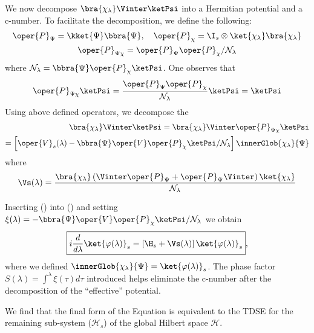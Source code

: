 We now decompose $\bra{\chi_\lambda}\Vinter\ketPsi$ into a Hermitian potential and a c-number. To facilitate the decomposition, we define the following:
 \begin{equation}
     \begin{gathered}
         \oper{P}_\Psi =\kket{\Psi} \bbra{\Psi}, \quad \oper{P}_\chi = \I_s \otimes \ket{\chi_\lambda}\bra{\chi_\lambda}\\
         \oper{P}_{\Psi \chi} = \oper{P}_\Psi\oper{P}_\chi /\mathcal{N}_\lambda
     \end{gathered}
 \end{equation}
where \(\mathcal{N}_\lambda = \bbra{\Psi}\oper{P}_\chi\ketPsi\). One observes that
\begin{equation}
\oper{P}_{\Psi \chi}\ketPsi = \frac{\oper{P}_\Psi\oper{P}_\chi}{\mathcal{N}_\lambda} \ketPsi
    = \ketPsi
\end{equation}
 Using above defined operators, we decompose the 
 \begin{equation}
 \label{eq:effective_Vs}
     \begin{aligned}
         \bra{\chi_\lambda}\Vinter\ketPsi = \bra{\chi_\lambda}\Vinter\oper{P}_{\Psi \chi}\ketPsi\\
         = \left[\oper{V}_s (\lambda)- \bbra{\Psi} \oper{V}\oper{P}_\chi \ketPsi/\mathcal{N}_\lambda \right] \innerGlob{\chi_\lambda}{\Psi}
     \end{aligned}
 \end{equation}
where 
\begin{equation}
    \label{eq:chap3_effective_Vs}
    \Vs(\lambda) = \frac{\bra{\chi_\lambda} \left(\Vinter\oper{P}_{\Psi} + \oper{P}_{\Psi}\Vinter\right)\ket{\chi_\lambda}}{\mathcal{N}_\lambda}
\end{equation}

Inserting () into () and setting \(\xi(\lambda) = -\bbra{\Psi} \oper{V}\oper{P}_\chi \ketPsi/\mathcal{N}_\lambda\) we obtain
\begin{equation}
\label{eq:chap3_sebgem_TDSE}
 \boxed{ i\dfrac{d}{d\lambda}\ket{\varphi(\lambda)}_s= \left[\H_s + \Vs (\lambda)\right]\ket{\varphi(\lambda)}_s},
\end{equation}
where we defined \(\innerGlob{\chi_\lambda}{\Psi} = \ket{\varphi(\lambda)}_s\).  The phase factor  \(S(\lambda) = \int^\lambda \xi(\tau)d\tau \) introduced helps eliminate the c-number after the decomposition of the ``effective'' potential. 

We find that the final form of the Equation is equivalent to the TDSE for the remaining sub-system (\(\mathcal{H}_s\)) of the
global Hilbert space \(\mathcal{H}\).

